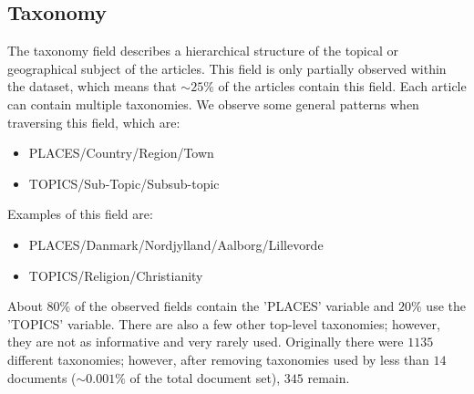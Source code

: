\subsection{Taxonomy}\label{sec:dataset_taxonomy}
The taxonomy field describes a hierarchical structure of the topical or geographical subject of the articles.
This field is only partially observed within the dataset, which means that ${\sim}25\%$ of the articles contain this field.
Each article can contain multiple taxonomies.
We observe some general patterns when traversing this field, which are:
\begin{itemize}
	\item PLACES/Country/Region/Town
	\item TOPICS/Sub-Topic/Subsub-topic
\end{itemize}
Examples of this field are:
\begin{itemize}
	\item PLACES/Danmark/Nordjylland/Aalborg/Lillevorde
	\item TOPICS/Religion/Christianity
\end{itemize}
About $80\%$ of the observed fields contain the 'PLACES' variable and $20\%$ use the 'TOPICS' variable.
There are also a few other top-level taxonomies; however, they are not as informative and very rarely used.
Originally there were $1135$ different taxonomies; however, after removing taxonomies used by less than $14$ documents (${\sim}0.001\%$ of the total document set), $345$ remain.
